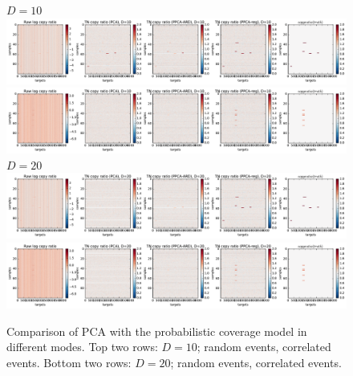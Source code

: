 \documentclass[nofootinbib,amssymb,amsmath]{revtex4}
\begin{document}
\begin{figure}
\center
$D=10$\\
\vspace{10pt}
\includegraphics[scale=0.45]{figs/comp_random_events_10.pdf}
\vspace{20pt}
\includegraphics[scale=0.45]{figs/comp_corr_events_10.pdf}
$D=20$\\
\vspace{10pt}
\includegraphics[scale=0.45]{figs/comp_random_events_20.pdf}
\includegraphics[scale=0.45]{figs/comp_corr_events_20.pdf}
\caption{Comparison of PCA with the probabilistic coverage model in different modes. Top two rows: $D=10$; random events, correlated events. Bottom two rows: $D=20$; random events, correlated events.}
\label{fig:comp_regularizer}
\end{figure}
\end{document}

